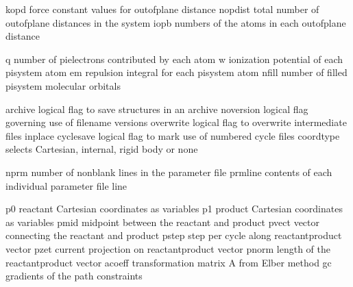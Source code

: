 \documentclass[letterpaper,11pt,english]{sphinxmanual}
\begin{document}

\begin{sphinxVerbatim}[commandchars=\\\{\}]
kopd            force constant values for out\PYGZhy{}of\PYGZhy{}plane distance
nopdist         total number of out\PYGZhy{}of\PYGZhy{}plane distances in the system
iopb            numbers of the atoms in each out\PYGZhy{}of\PYGZhy{}plane distance
\end{sphinxVerbatim}


\begin{sphinxVerbatim}[commandchars=\\\{\}]
q               number of pi\PYGZhy{}electrons contributed by each atom
w               ionization potential of each pisystem atom
em              repulsion integral for each pisystem atom
nfill           number of filled pisystem molecular orbitals
\end{sphinxVerbatim}


\begin{sphinxVerbatim}[commandchars=\\\{\}]
archive         logical flag to save structures in an archive
noversion       logical flag governing use of filename versions
overwrite       logical flag to overwrite intermediate files inplace
cyclesave       logical flag to mark use of numbered cycle files
coordtype       selects Cartesian, internal, rigid body or none
\end{sphinxVerbatim}


\begin{sphinxVerbatim}[commandchars=\\\{\}]
nprm            number of nonblank lines in the parameter file
prmline         contents of each individual parameter file line
\end{sphinxVerbatim}


\begin{sphinxVerbatim}[commandchars=\\\{\}]
p0              reactant Cartesian coordinates as variables
p1              product Cartesian coordinates as variables
pmid            midpoint between the reactant and product
pvect           vector connecting the reactant and product
pstep           step per cycle along reactant\PYGZhy{}product vector
pzet            current projection on reactant\PYGZhy{}product vector
pnorm           length of the reactant\PYGZhy{}product vector
acoeff          transformation matrix \PYGZdq{}A\PYGZdq{} from Elber method
gc              gradients of the path constraints
\end{sphinxVerbatim}
\end{document}
